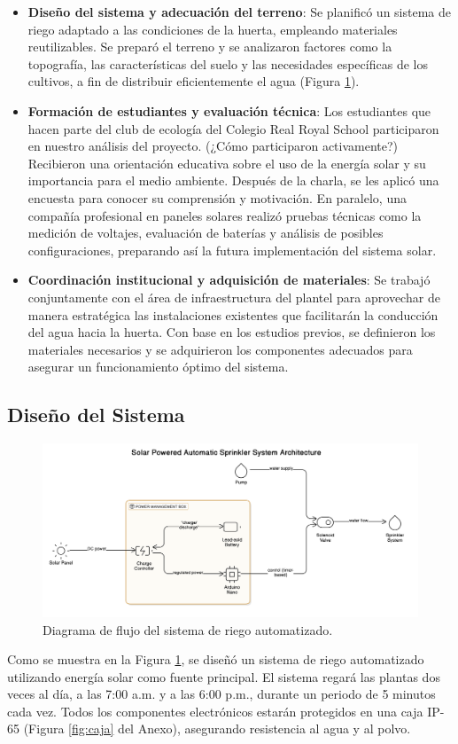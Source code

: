 \documentclass[12pt]{article}
\begin{document}
\begin{itemize}
      \item \textbf{Diseño del sistema y adecuación del terreno}: Se planificó un sistema de riego adaptado a las condiciones de la huerta, empleando materiales reutilizables. Se preparó el terreno y se analizaron factores como la topografía, las características del suelo y las necesidades específicas de los cultivos, a fin de distribuir eficientemente el agua (Figura \ref{fig:diagrama}).
      \item \textbf{Formación de estudiantes y evaluación técnica}: Los estudiantes que hacen parte del club de ecología del Colegio Real Royal School participaron en nuestro análisis del proyecto. (¿Cómo participaron activamente?) Recibieron una orientación educativa sobre el uso de la energía solar y su importancia para el medio ambiente. Después de la charla, se les aplicó una encuesta para conocer su comprensión y motivación. En paralelo, una compañía profesional en paneles solares realizó pruebas técnicas como la medición de voltajes, evaluación de baterías y análisis de posibles configuraciones, preparando así la futura implementación del sistema solar.
      \item \textbf{Coordinación institucional y adquisición de materiales}: Se trabajó conjuntamente con el área de infraestructura del plantel para aprovechar de manera estratégica las instalaciones existentes que facilitarán la conducción del agua hacia la huerta. Con base en los estudios previos, se definieron los materiales necesarios y se adquirieron los componentes adecuados para asegurar un funcionamiento óptimo del sistema.
\end{itemize}



\subsection{Diseño del Sistema}
\begin{figure}[htbp]
      \centering
      \includegraphics[width=1\textwidth]{imagenes/diagram.png}
      \caption{Diagrama de flujo del sistema de riego automatizado.}
      \label{fig:diagrama}
\end{figure}
Como se muestra en la Figura \ref{fig:diagrama}, se diseñó un sistema de riego automatizado utilizando energía solar como fuente principal. El sistema regará las plantas dos veces al día, a las 7:00 a.m. y a las 6:00 p.m., durante un periodo de 5 minutos cada vez. Todos los componentes electrónicos estarán protegidos en una caja IP-65 (Figura \ref{fig:caja} del Anexo), asegurando resistencia al agua y al polvo.
\end{document}

